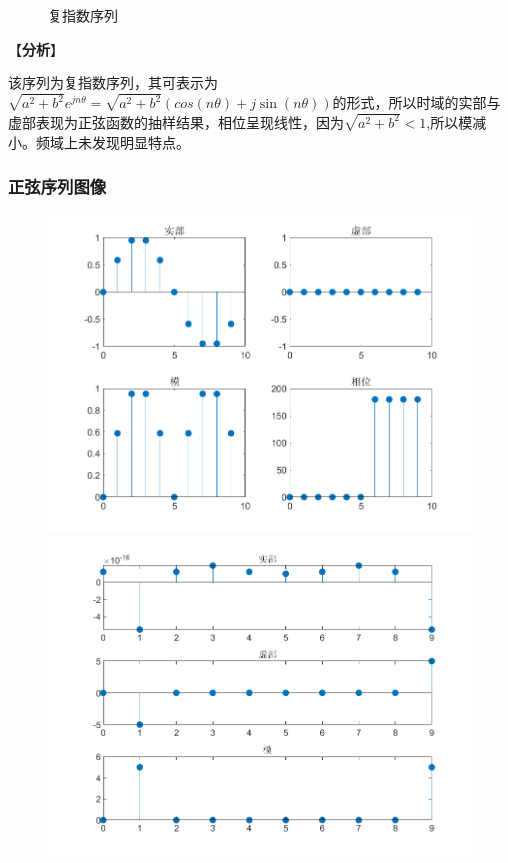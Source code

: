 \documentclass{../source/zjureport}
\begin{document}
\begin{figure}[H]
\begin{minipage}[t]{0.48\textwidth}
                    \end{minipage}
                    \caption{复指数序列}
                \end{figure}


                【\textbf{分析}】

                该序列为复指数序列，其可表示为$\sqrt{a^2+b^2}e^{jn\theta} =\sqrt{a^2+b^2}(cos(n\theta)+j\sin(n\theta))$的形式，所以时域的实部与虚部表现为正弦函数的抽样结果，相位呈现线性，因为$\sqrt{a^2+b^2}<1$,所以模减小。频域上未发现明显特点。
                

            \subsubsection{正弦序列图像}
                \begin{figure}[H]
                    \centering
                    \begin{minipage}[t]{0.48\textwidth}
                    \centering
                    \includegraphics[width=\textwidth]{figure/正弦序列.png}
                    \end{minipage}
                    \begin{minipage}[t]{0.48\textwidth}
                    \centering
                    \includegraphics[width=\textwidth]{figure/频谱_正弦序列.png}

\end{minipage}
\end{figure}
\end{document}
